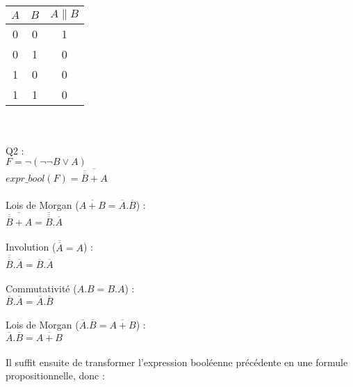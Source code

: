 \documentclass{article}
\begin{document}
\\
\begin{tabular}{|c|c|c|}
\hline
$A$ & $B$ & $A \parallel B$ \\ 
\hline
0 & 0 & 1 \\ 
\hline
0 & 1 & 0 \\ 
\hline
1 & 0 & 0 \\ 
\hline
1 & 1 & 0 \\ 
\hline
\end{tabular}
\vspace*{3mm}
\newline
\\
\\
Q2 : 
\newline
\\
$F = \neg (\neg\neg B \lor A)$
\newline
\\
$expr\_bool(F) = \overline{\overline{\overline{B}} + A}$
\newline
\\
\\
Lois de Morgan ($\overline{A + B} = \overline{A}.\overline{B}$) :
\newline
\\
$\overline{\overline{\overline{B}} + A} = \overline{\overline{\overline{B}}} . \overline{A}$
\newline
\\
\\
Involution ($\overline{\overline{A}} = A$) :
\newline
\\
$\overline{\overline{\overline{B}}} . \overline{A} = \overline{B} . \overline{A}$
\newline
\\
\\
Commutativité ($A.B = B.A$) :
\newline
\\
$\overline{B} . \overline{A} = \overline{A} . \overline{B}$
\newline
\\
\\
Lois de Morgan ($\overline{A} . \overline{B} = \overline{A + B}$) :
\newline
\\
$\overline{A} . \overline{B} = \overline{A + B}$ 
\newline
\\
\\
Il suffit ensuite de transformer l'expression booléenne précédente en une formule propositionnelle, donc :
\end{document}
